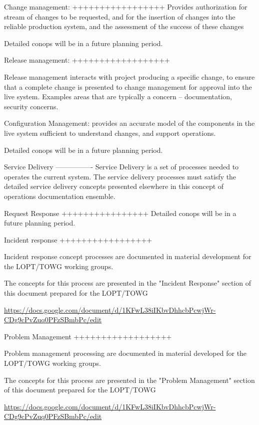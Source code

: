 Change management:
+++++++++++++++++
Provides authorization for stream of changes to be requested, and for the insertion
of changes into the reliable production system, and the assessment of the success of these changes 

Detailed conops will be in a future planning period.


Release management:
++++++++++++++++++

Release management interacts with project producing a specific change, to ensure that
a complete change is presented to change management for approval into the live system.
Examples areas that are typically a concern -- documentation, security concerns.

Configuration Management: provides an accurate model of the components in the live
system sufficient to understand changes, and support operations.

Detailed conops will be in a future planning period.

Service Delivery
----------------
Service Delivery is a set of processes needed to operates the current system.  The service delivery
processes must satisfy the detailed service delivery concepts presented elsewhere in this concept of
operations documentation ensemble. 

Request Response
++++++++++++++++
Detailed conops will be in a future planning period.

Incident response
+++++++++++++++++

Incident response concept processes are documented in material development for the
LOPT/TOWG working groups. 

The concepts for this process are presented in the "Incident Response" section of this document prepared for the LOPT/TOWG

\url{https://docs.google.com/document/d/1KFwL38iIKbvDhhcbPcwjWr-CDg9cPvZuq0PFzSBmbPc/edit}

Problem Management
++++++++++++++++++

Problem management processing are documented in material developed for the LOPT/TOWG working groups.

The concepts for this process are presented in the "Problem Management" section of this document prepared for the LOPT/TOWG

\url{https://docs.google.com/document/d/1KFwL38iIKbvDhhcbPcwjWr-CDg9cPvZuq0PFzSBmbPc/edit}
